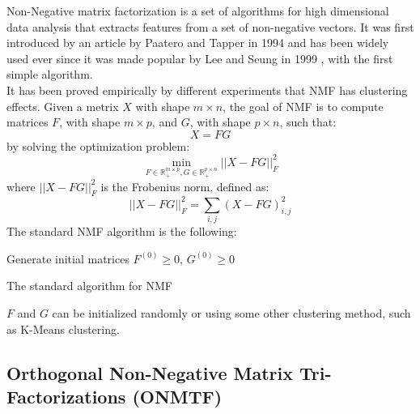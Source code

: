 Non-Negative matrix factorization is a set of algorithms for high dimensional data analysis that extracts features from a set of non-negative vectors. It was first introduced by an article by Paatero and Tapper in 1994 \cite{10.1002/env.3170050203} and has been widely used ever since it was made popular by Lee and Seung in 1999 \cite{10.1038/44565}, with the first simple algorithm.\\
It has been proved empirically by different experiments \cite{10.5555/1005332.1044709, 10.1109/CVPR.2001.990477} that NMF has clustering effects.
Given a metrix $X$ with shape $m \times n$, the goal of NMF is to compute matrices $F$, with shape $m \times p$, and $G$, with shape $p \times n$, such that:
\begin{equation*}
X = FG
\end{equation*}
by solving the optimization problem:
\begin{equation*}
\min_{F \in \mathbb{R}^{m \times p}_+, G \in \mathbb{R}^{p \times n}_+} ||X - FG||^2_F
\end{equation*}
where $||X - FG||^2_F$ is the Frobenius norm, defined as:
\begin{equation*}
||X - FG||^2_F = \sum_{i,j} (X - FG)^2_{i,j}
\end{equation*}
The standard NMF algorithm is the following:
\vskip 0.7cm
\begin{algorithm}[H]
Generate initial matrices $F^{(0)} \geq 0$, $G^{(0)} \geq 0$\;
\caption{The standard algorithm for NMF}
\end{algorithm}
\vskip 0.7cm
$F$ and $G$ can be initialized randomly or using some other clustering method, such as K-Means clustering.


\subsection{Orthogonal Non-Negative Matrix Tri-Factorizations (ONMTF)}

